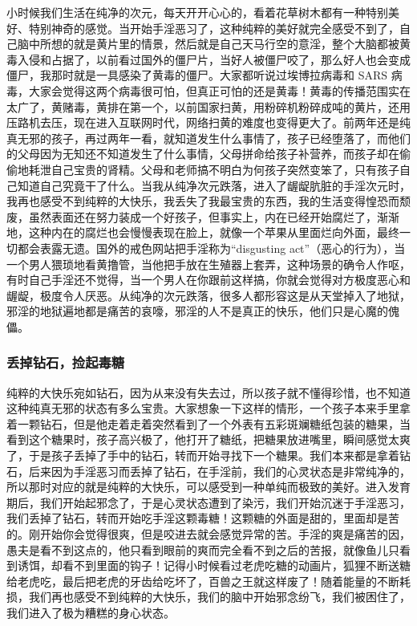 小时候我们生活在纯净的次元，每天开开心心的，看着花草树木都有一种特别美好、特别神奇的感觉。当开始手淫恶习了，这种纯粹的美好就完全感受不到了，自己脑中所想的就是黄片里的情景，然后就是自己天马行空的意淫，整个大脑都被黄毒入侵和占据了，以前看过国外的僵尸片，当好人被僵尸咬了，那么好人也会变成僵尸，我那时就是一具感染了黄毒的僵尸。大家都听说过埃博拉病毒和 SARS 病毒，大家会觉得这两个病毒很可怕，但真正可怕的还是黄毒！黄毒的传播范围实在太广了，黄赌毒，黄排在第一个，以前国家扫黄，用粉碎机粉碎成吨的黄片，还用压路机去压，现在进入互联网时代，网络扫黄的难度也变得更大了。前两年还是纯真无邪的孩子，再过两年一看，就知道发生什么事情了，孩子已经堕落了，而他们的父母因为无知还不知道发生了什么事情，父母拼命给孩子补营养，而孩子却在偷偷地耗泄自己宝贵的肾精。父母和老师搞不明白为何孩子突然变笨了，只有孩子自己知道自己究竟干了什么。当我从纯净次元跌落，进入了龌龊肮脏的手淫次元时，我再也感受不到纯粹的大快乐，我丢失了我最宝贵的东西，我的生活变得惶恐而颓废，虽然表面还在努力装成一个好孩子，但事实上，内在已经开始腐烂了，渐渐地，这种内在的腐烂也会慢慢表现在脸上，就像一个苹果从里面烂向外面，最终一切都会表露无遗。国外的戒色网站把手淫称为“disgusting act”（恶心的行为），当一个男人猥琐地看黄撸管，当他把手放在生殖器上套弄，这种场景的确令人作呕，有时自己手淫还不觉得，当一个男人在你跟前这样搞，你就会觉得对方极度恶心和龌龊，极度令人厌恶。从纯净的次元跌落，很多人都形容这是从天堂掉入了地狱，邪淫的地狱遍地都是痛苦的哀嚎，邪淫的人不是真正的快乐，他们只是心魔的傀儡。

\subsubsection{丢掉钻石，捡起毒糖}

纯粹的大快乐宛如钻石，因为从来没有失去过，所以孩子就不懂得珍惜，也不知道这种纯真无邪的状态有多么宝贵。大家想象一下这样的情形，一个孩子本来手里拿着一颗钻石，但是他走着走着突然看到了一个外表有五彩斑斓糖纸包装的糖果，当看到这个糖果时，孩子高兴极了，他打开了糖纸，把糖果放进嘴里，瞬间感觉太爽了，于是孩子丢掉了手中的钻石，转而开始寻找下一个糖果。我们本来都是拿着钻石，后来因为手淫恶习而丢掉了钻石，在手淫前，我们的心灵状态是非常纯净的，所以那时对应的就是纯粹的大快乐，可以感受到一种单纯而极致的美好。进入发育期后，我们开始起邪念了，于是心灵状态遭到了染污，我们开始沉迷于手淫恶习，我们丢掉了钻石，转而开始吃手淫这颗毒糖！这颗糖的外面是甜的，里面却是苦的。刚开始你会觉得很爽，但是咬进去就会感觉异常的苦。手淫的爽是痛苦的因，愚夫是看不到这点的，他只看到眼前的爽而完全看不到之后的苦报，就像鱼儿只看到诱饵，却看不到里面的钩子！记得小时候看过老虎吃糖的动画片，狐狸不断送糖给老虎吃，最后把老虎的牙齿给吃坏了，百兽之王就这样废了！随着能量的不断耗损，我们再也感受不到纯粹的大快乐，我们的脑中开始邪念纷飞，我们被困住了，我们进入了极为糟糕的身心状态。

